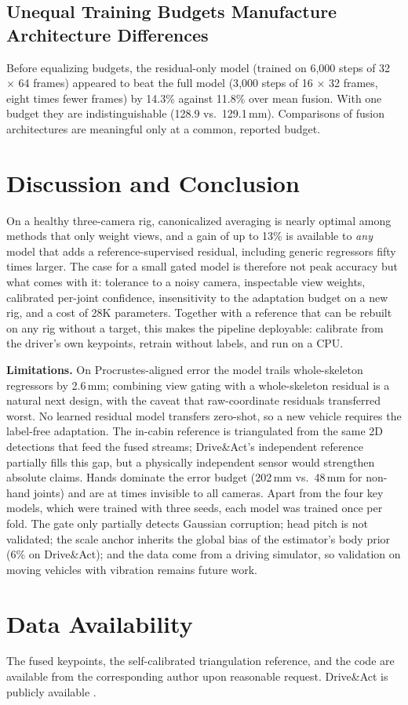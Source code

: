 \documentclass[journal]{IEEEtran}
\newcommand{\da}{Drive\&Act}
\begin{document}
\subsection{Unequal Training Budgets Manufacture Architecture Differences}
Before equalizing budgets, the residual-only model (trained on 6{,}000 steps of 32 $\times$ 64 frames) appeared to beat the full model (3{,}000 steps of 16 $\times$ 32 frames, eight times fewer frames) by 14.3\% against 11.8\% over mean fusion. With one budget they are indistinguishable (128.9 vs.\ 129.1\,mm). Comparisons of fusion architectures are meaningful only at a common, reported budget.

\section{Discussion and Conclusion}
On a healthy three-camera rig, canonicalized averaging is nearly optimal among methods that only weight views, and a gain of up to 13\% is available to \emph{any} model that adds a reference-supervised residual, including generic regressors fifty times larger. The case for a small gated model is therefore not peak accuracy but what comes with it: tolerance to a noisy camera, inspectable view weights, calibrated per-joint confidence, insensitivity to the adaptation budget on a new rig, and a cost of 28K parameters. Together with a reference that can be rebuilt on any rig without a target, this makes the pipeline deployable: calibrate from the driver's own keypoints, retrain without labels, and run on a CPU.

\textbf{Limitations.} On Procrustes-aligned error the model trails whole-skeleton regressors by 2.6\,mm; combining view gating with a whole-skeleton residual is a natural next design, with the caveat that raw-coordinate residuals transferred worst. No learned residual model transfers zero-shot, so a new vehicle requires the label-free adaptation. The in-cabin reference is triangulated from the same 2D detections that feed the fused streams; \da{}'s independent reference partially fills this gap, but a physically independent sensor would strengthen absolute claims. Hands dominate the error budget (202\,mm vs.\ 48\,mm for non-hand joints) and are at times invisible to all cameras. Apart from the four key models, which were trained with three seeds, each model was trained once per fold. The gate only partially detects Gaussian corruption; head pitch is not validated; the scale anchor inherits the global bias of the estimator's body prior (6\% on \da{}); and the data come from a driving simulator, so validation on moving vehicles with vibration remains future work.

\section*{Data Availability}
The fused keypoints, the self-calibrated triangulation reference, and the code are available from the corresponding author upon reasonable request. \da{} is publicly available \cite{martin2019drive}.



\end{document}
